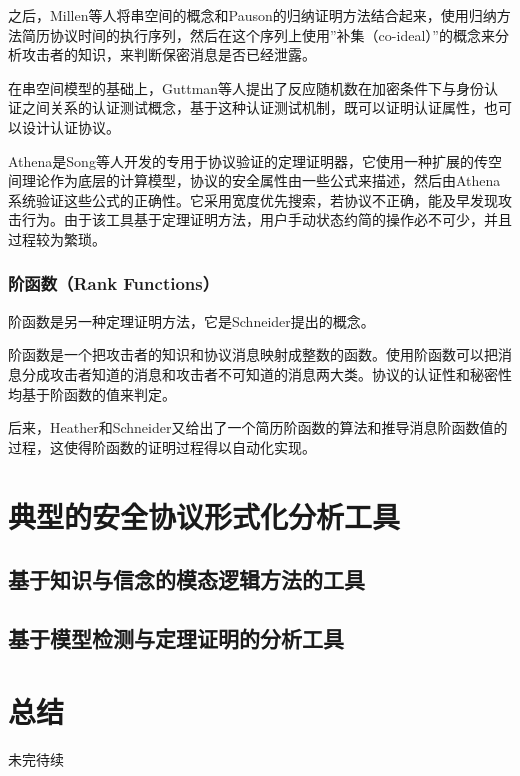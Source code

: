 \documentclass[cs4size,a4pape,UTF8]{ctexart}
\numberwithin{equation}{section}
\numberwithin{table}{section}
\numberwithin{figure}{section}
\begin{document}
之后，Millen等人将串空间的概念和Pauson的归纳证明方法结合起来，使用归纳方法简历协议时间的执行序列，然后在这个序列上使用''补集（co-ideal）''的概念来分析攻击者的知识，来判断保密消息是否已经泄露。

在串空间模型的基础上，Guttman等人提出了反应随机数在加密条件下与身份认证之间关系的认证测试概念，基于这种认证测试机制，既可以证明认证属性，也可以设计认证协议。

Athena是Song等人开发的专用于协议验证的定理证明器，它使用一种扩展的传空间理论作为底层的计算模型，协议的安全属性由一些公式来描述，然后由Athena系统验证这些公式的正确性。它采用宽度优先搜索，若协议不正确，能及早发现攻击行为。由于该工具基于定理证明方法，用户手动状态约简的操作必不可少，并且过程较为繁琐\cite{6}。

\subsubsection{阶函数（Rank Functions）}
阶函数是另一种定理证明方法，它是Schneider提出的概念。

阶函数是一个把攻击者的知识和协议消息映射成整数的函数。使用阶函数可以把消息分成攻击者知道的消息和攻击者不可知道的消息两大类。协议的认证性和秘密性均基于阶函数的值来判定。

后来，Heather和Schneider又给出了一个简历阶函数的算法和推导消息阶函数值的过程，这使得阶函数的证明过程得以自动化实现\cite{6}。

\section{典型的安全协议形式化分析工具}
\subsection{基于知识与信念的模态逻辑方法的工具}
\subsection{基于模型检测与定理证明的分析工具}


\section{总结}
未完待续

\clearpage
\end{document}
